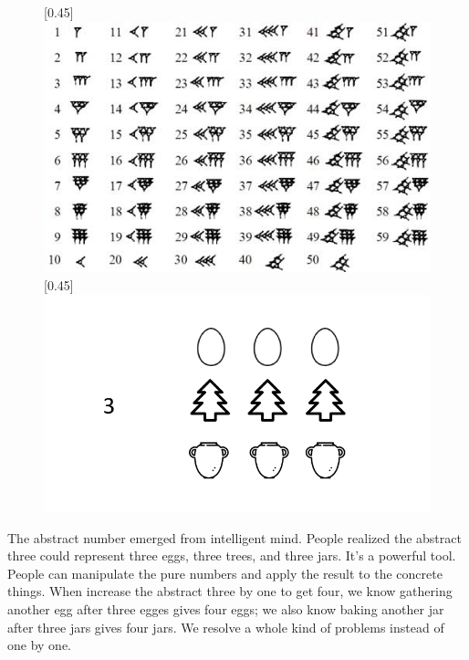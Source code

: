 \documentclass[UTF8]{article}
\begin{document}
\begin{figure}[htbp]
 \centering
 [0.45\linewidth]{
   \includegraphics[scale=0.42]{img/Babylonian_numerals.jpg}} \quad \quad
 [0.45\linewidth]{
   \includegraphics[scale=0.25]{img/abstract-num.png}}
 \captionsetup{labelformat=empty}
 \label{fig:babylonian-num}
 \label{fig:abstract-num}
\end{figure}

The abstract number emerged from intelligent mind. People realized the abstract three could represent three eggs, three trees, and three jars. It's a powerful tool. People can manipulate the pure numbers and apply the result to the concrete things. When increase the abstract three by one to get four, we know gathering another egg after three egges gives four eggs; we also know baking another jar after three jars gives four jars. We resolve a whole kind of problems instead of one by one.
\end{document}
